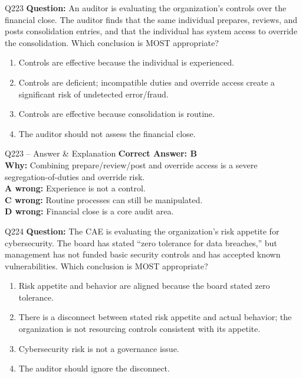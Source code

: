 \documentclass[aspectratio=169,10pt]{beamer}
\begin{document}
	\begin{frame}[t]{Q223}
		\small
		\textbf{Question:} An auditor is evaluating the organization's controls over the financial close. The auditor finds that the same individual prepares, reviews, and posts consolidation entries, and that the individual has system access to override the consolidation. Which conclusion is MOST appropriate?
		\begin{enumerate}[label=\Alph*.,itemsep=1pt,topsep=2pt]
			\item Controls are effective because the individual is experienced.
			\item Controls are deficient; incompatible duties and override access create a significant risk of undetected error/fraud.
			\item Controls are effective because consolidation is routine.
			\item The auditor should not assess the financial close.
		\end{enumerate}
	\end{frame}
	
	\begin{frame}[t]{Q223 -- Answer \& Explanation}
		\small
		\textbf{Correct Answer: B} \\[4pt]
		\textbf{Why:} Combining prepare/review/post and override access is a severe segregation-of-duties and override risk. \\[4pt]
		\textbf{A wrong:} Experience is not a control. \\[2pt]
		\textbf{C wrong:} Routine processes can still be manipulated. \\[2pt]
		\textbf{D wrong:} Financial close is a core audit area.
	\end{frame}
	
	\begin{frame}[t]{Q224}
		\small
		\textbf{Question:} The CAE is evaluating the organization's risk appetite for cybersecurity. The board has stated ``zero tolerance for data breaches,'' but management has not funded basic security controls and has accepted known vulnerabilities. Which conclusion is MOST appropriate?
		\begin{enumerate}[label=\Alph*.,itemsep=1pt,topsep=2pt]
			\item Risk appetite and behavior are aligned because the board stated zero tolerance.
			\item There is a disconnect between stated risk appetite and actual behavior; the organization is not resourcing controls consistent with its appetite.
			\item Cybersecurity risk is not a governance issue.
			\item The auditor should ignore the disconnect.
		\end{enumerate}
	\end{frame}
	
\end{document}
